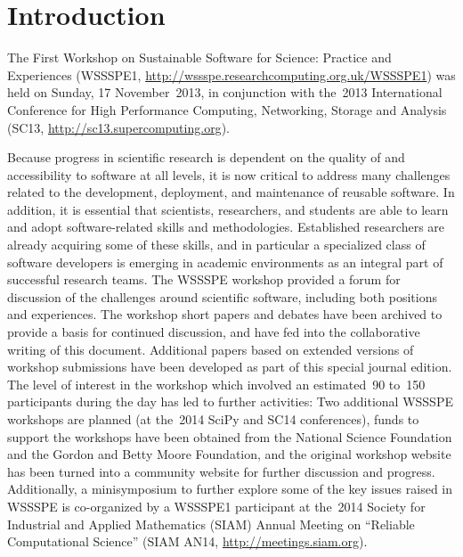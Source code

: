 \documentclass[11pt, oneside]{amsart}
\newcommand{\todo}[1]{{\color{blue}$\blacksquare$~\textsf{[TODO: #1]}}}
\newcommand{\note}[1]{ {\textcolor{red}    { #1 }}}
\begin{document}
\begin{comment}
The original document is
\url{https://docs.google.com/document/d/1eVfioGNlihXG_1Y8BgdCI6tXZKrybZgz5XuQHjT1oKU/edit?pli=1#}
(but can no longer be edited).  Note that the original document has
comments in addition to text.
\end{comment}

%
%
%

\section{Introduction}

The First Workshop on Sustainable Software for Science: Practice and
Experiences (WSSSPE1,
\url{http://wssspe.researchcomputing.org.uk/WSSSPE1}) was held on
Sunday, 17 November~2013, in conjunction with the~2013 International
Conference for High Performance Computing, Networking, Storage and
Analysis (SC13, \url{http://sc13.supercomputing.org}).

Because progress in scientific research is dependent on the quality of and
accessibility to software at all levels, it is now critical to address many
challenges related to the development, deployment, and maintenance of reusable
software.
In addition, it is essential that scientists,
researchers, and students are able to learn and adopt software-related skills
and methodologies. Established researchers are already acquiring some of these
skills, and in particular a specialized class of software developers is
emerging in academic environments as an integral part of
successful research teams. The WSSSPE workshop  provided a forum
for discussion of the challenges around scientific software, including both positions and experiences. The
workshop short papers and debates have been archived to provide a basis for continued
discussion, and have fed into the collaborative writing of this
document. Additional papers based on extended versions of workshop
submissions have been developed as part of this special journal edition. The level of interest in the workshop which involved
an estimated~90 to~150 participants during the day has led to further activities:
Two additional WSSSPE workshops are planned  (at the~2014 SciPy and SC14 conferences),
funds to support the workshops have been obtained from
the National Science Foundation and the Gordon and Betty Moore
Foundation, and the
original workshop website has been turned into a community website for
further discussion and progress. Additionally, a minisymposium  to
further explore some of the key issues raised in WSSSPE is co-organized by a
WSSSPE1 participant at the~2014 Society for Industrial and Applied Mathematics
(SIAM) Annual Meeting on ``Reliable
Computational Science'' (SIAM AN14, \url{http://meetings.siam.org}).
\end{document}
